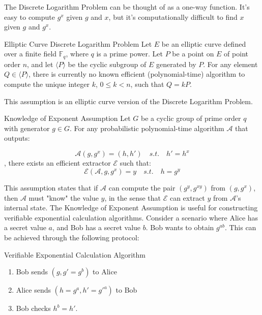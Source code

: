 \documentclass{article}
\begin{document}
The Discrete Logarithm Problem can be thought of as a one-way function. It's easy to compute $g^{x}$ given $g$ and $x$, but it's computationally difficult to find $x$ given $g$ and $g^{x}$.

\begin{assumption}{Elliptic Curve Discrete Logarithm Problem}{}
Let $E$ be an elliptic curve defined over a finite field $\mathbb{F}_q$, where $q$ is a prime power. Let $P$ be a point on $E$ of point order $n$, and let $\langle P \rangle$ be the cyclic subgroup of $E$ generated by $P$. For any element $Q \in \langle P \rangle$, there is currently no known efficient (polynomial-time) algorithm to compute the unique integer $k$, $0 \leq k < n$, such that $Q = kP$.
\end{assumption}

This assumption is an elliptic curve version of the Discrete Logarithm Problem.

\begin{assumption}{Knowledge of Exponent Assumption}{}
Let $G$ be a cyclic group of prime order $q$ with generator $g \in G$. For any probabilistic polynomial-time algorithm $\mathcal{A}$ that outputs:

\begin{equation}
\mathcal{A}(g, g^x) = (h, h') \quad s.t. \quad h' = h^x
\end{equation}
, there exists an efficient extractor $\mathcal{E}$ such that:
\begin{equation}
\mathcal{E}(\mathcal{A}, g, g^x) = y \quad s.t. \quad h = g^y
\end{equation}
\end{assumption}

This assumption states that if $\mathcal{A}$ can compute the pair $(g^y, g^{xy})$ from $(g, g^x)$, then $\mathcal{A}$ must "know" the value $y$, in the sense that $\mathcal{E}$ can extract $y$ from $\mathcal{A}$'s internal state.
The Knowledge of Exponent Assumption is useful for constructing verifiable exponential calculation algorithms. Consider a scenario where Alice has a secret value $a$, and Bob has a secret value $b$. Bob wants to obtain $g^{ab}$. This can be achieved through the following protocol:

\begin{protocol}{Verifiable Exponential Calculation Algorithm}{}
    \begin{enumerate}
    \item Bob sends $(g, g'=g^{b})$ to Alice
    \item Alice sends $(h=g^{a}, h'=g'^{a})$ to Bob
    \item Bob checks $h^{b} = h'$.
\end{enumerate}
\end{protocol}
\end{document}
